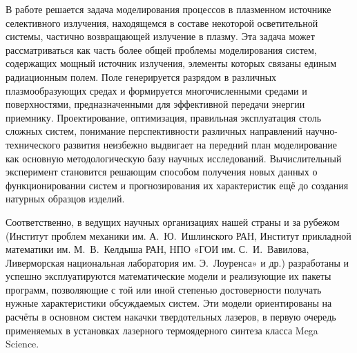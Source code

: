 
В работе решается задача моделирования процессов в плазменном источнике селективного излучения, находящемся в составе некоторой осветительной системы, частично возвращающей излучение в плазму.
Эта задача может рассматриваться как часть более общей проблемы моделирования систем, содержащих мощный источник излучения, элементы которых связаны единым радиационным полем.
Поле генерируется разрядом в различных плазмообразующих средах и формируется многочисленными средами и поверхностями, предназначенными для эффективной передачи энергии приемнику.
Проектирование, оптимизация, правильная эксплуатация столь сложных систем, понимание перспективности различных направлений научно-технического развития неизбежно выдвигает на передний план моделирование как основную методологическую базу научных исследований.
Вычислительный эксперимент становится решающим способом получения новых данных о функционировании систем и прогнозирования их характеристик ещё до создания натурных образцов изделий.

Соответственно, в ведущих научных организациях нашей страны и за рубежом (Институт проблем механики им. А.~Ю.~Ишлинского РАН, Институт прикладной математики им. М.~В.~Келдыша РАН, НПО «ГОИ им. С.~И.~Вавилова, Ливерморская национальная лаборатория им. Э.~Лоуренса» и др.) разработаны и успешно эксплуатируются математические модели и реализующие их пакеты программ, позволяющие с той или иной степенью достоверности получать нужные характеристики обсуждаемых систем.
Эти модели ориентированы на расчёты в основном систем накачки твердотельных лазеров, в первую очередь применяемых в установках лазерного термоядерного синтеза класса Mega Science.

